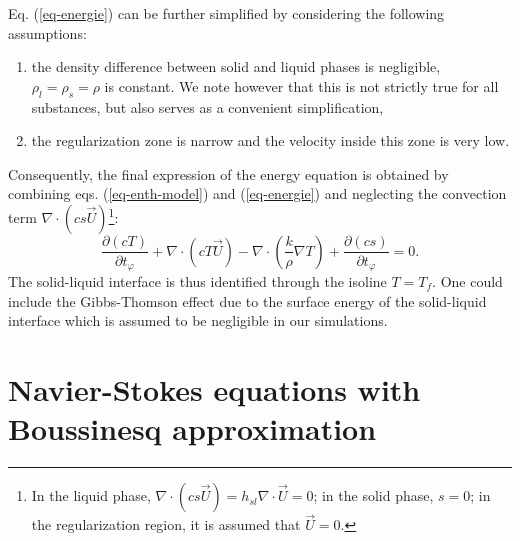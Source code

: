 \noindent Eq. (\ref{eq-energie}) can be further simplified by considering the following assumptions: 
\begin{enumerate}[label=(\roman*)]
\item the density difference between solid and liquid phases is negligible, \ie $\rho_l=\rho_s=\rho$ is constant. 
We note however that this is not strictly true for all substances, but also serves as a convenient simplification,
\item the regularization zone is narrow and the velocity inside this zone is very low. 
\end{enumerate}
Consequently, the final expression of the energy equation is obtained by combining eqs. (\ref{eq-enth-model})  and (\ref{eq-energie}) and  neglecting the convection term $\nabla \cdot ( c s \vec{U})$\footnote{In the liquid phase, $\nabla \cdot ( c s \vec{U})  = h_{sl} \nabla \cdot  \vec{U}=0$; in the solid phase, $s=0$; in the regularization region, it is assumed that $\vec{U}=0.$}:
\begin{equation}\label{eq-energie-enth-model}
\frac{\partial \left(c T\right)}{\partial t_{\varphi}} + \nabla \cdot\left( c T \vec{U}\right) -
\nabla \cdot\left( \frac{k}{\rho} \nabla T \right) +  \frac{\partial \left(c s\right)}{\partial t_{\varphi}}  = 0.
\end{equation}
The solid-liquid interface is thus identified through the isoline $T=T_f$.
One could include the Gibbs-Thomson effect due to the surface energy of the solid-liquid interface which is assumed to be negligible in our simulations.

\section{Navier-Stokes equations with Boussinesq approximation}

